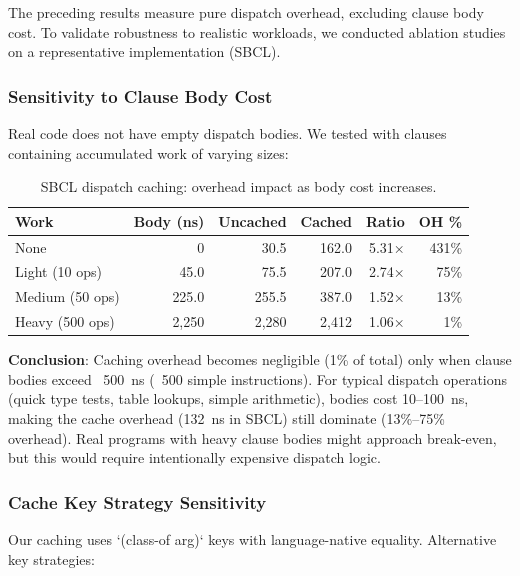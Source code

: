 \documentclass[sigplan,final,acmsmall,review,screen]{acmart}
\begin{document}
The preceding results measure pure dispatch overhead, excluding clause body cost. To validate robustness to realistic workloads,
we conducted ablation studies on a representative implementation (SBCL).

\subsubsection{Sensitivity to Clause Body Cost}

Real code does not have empty dispatch bodies. We tested with clauses containing accumulated work of varying sizes:

\begin{table}[h!]
\centering
\small
\caption{SBCL dispatch caching: overhead impact as body cost increases.}
\label{tab:body-cost}
\begin{tabular}{@{}lrrrrr@{}}
\toprule
\textbf{Work} & \textbf{Body (ns)} & \textbf{Uncached} & \textbf{Cached} & \textbf{Ratio} & \textbf{OH \%} \\
\midrule
None & 0 & 30.5 & 162.0 & 5.31× & 431\% \\
Light (10 ops) & 45.0 & 75.5 & 207.0 & 2.74× & 75\% \\
Medium (50 ops) & 225.0 & 255.5 & 387.0 & 1.52× & 13\% \\
Heavy (500 ops) & 2,250 & 2,280 & 2,412 & 1.06× & 1\% \\
\bottomrule
\end{tabular}
\end{table}

\textbf{Conclusion}: Caching overhead becomes negligible (1\% of total) only when clause bodies exceed ~500~ns (~500 simple instructions).
For typical dispatch operations (quick type tests, table lookups, simple arithmetic), bodies cost 10--100~ns, making the cache
overhead (132~ns in SBCL) still dominate (13\%--75\% overhead). Real programs with heavy clause bodies might approach break-even,
but this would require intentionally expensive dispatch logic.

\subsubsection{Cache Key Strategy Sensitivity}

Our caching uses `(class-of arg)` keys with language-native equality. Alternative key strategies:
\end{document}
